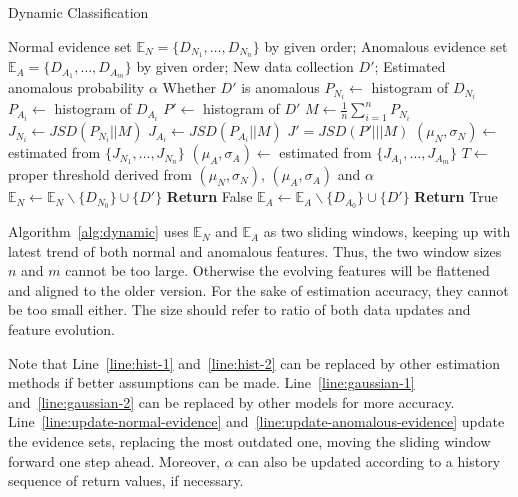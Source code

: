 \documentclass[10pt,conference,letterpaper]{IEEEtran}
\begin{document}
			\begin{algorithm}[!t]
				\caption{Dynamic Classification}
				\label{alg:dynamic}
				\begin{algorithmic}[1]
					\Require Normal evidence set $\mathbb{E}_N = \{D_{N_1}, \dots, D_{N_n}\}$ by given order; Anomalous evidence set $\mathbb{E}_A = \{D_{A_1}, \dots, D_{A_m}\}$ by given order; New data collection $D'$; Estimated anomalous probability $\alpha$
					\Ensure Whether $D'$ is anomalous
					\State $P_{N_i} \gets$ histogram of $D_{N_i}$\label{line:hist-1}
					\EndFor
					\State $P_{A_i} \gets$ histogram of $D_{A_i}$\label{line:hist-2}
					\EndFor
					\State $P' \gets$ histogram of $D'$
					\State $M \gets \frac{1}{n}\sum_{i=1}^{n}P_{N_i}$
					\State $J_{N_i} \gets JSD(P_{N_i}||M)$
					\EndFor
					\State $J_{A_i} \gets JSD(P_{A_i}||M)$
					\EndFor
					\State $J' = JSD(P'|||M)$
					\State $(\mu_N, \sigma_N) \gets$ estimated from $\{J_{N_1}, \dots, J_{N_n}\}$\label{line:gaussian-1}
					\State $(\mu_A, \sigma_A) \gets$ estimated from $\{J_{A_1}, \dots, J_{A_m}\}$\label{line:gaussian-2}
					\State $T \gets$ proper threshold derived from $(\mu_N, \sigma_N)$, $(\mu_A, \sigma_A)$ and $\alpha$
					\State $\mathbb{E}_N \gets \mathbb{E}_N \backslash \{D_{N_0}\} \cup \{D'\}$\label{line:update-normal-evidence}
					\State \textbf{Return} False
					\Else
					\State $\mathbb{E}_A \gets \mathbb{E}_A \backslash \{D_{A_0}\} \cup \{D'\}$\label{line:update-anomalous-evidence}
					\State \textbf{Return} True
					\EndIf
				\end{algorithmic}
			\end{algorithm}
	
			Algorithm~\ref{alg:dynamic} uses $\mathbb{E}_N$ and $\mathbb{E}_A$ as two sliding windows, keeping up with latest trend of both normal and anomalous features. Thus, the two window sizes $n$ and $m$ cannot be too large. Otherwise the evolving features will be flattened and aligned to the older version. For the sake of estimation accuracy, they cannot be too small either. The size should refer to ratio of both data updates and feature evolution.
			
			Note that Line~\ref{line:hist-1} and~\ref{line:hist-2} can be replaced by other estimation methods if better assumptions can be made. Line~\ref{line:gaussian-1} and~\ref{line:gaussian-2} can be replaced by other models for more accuracy. Line~\ref{line:update-normal-evidence} and~\ref{line:update-anomalous-evidence} update the evidence sets, replacing the most outdated one, moving the sliding window forward one step ahead. Moreover, $\alpha$ can also be updated according to a history sequence of return values, if necessary.
	
\end{document}
